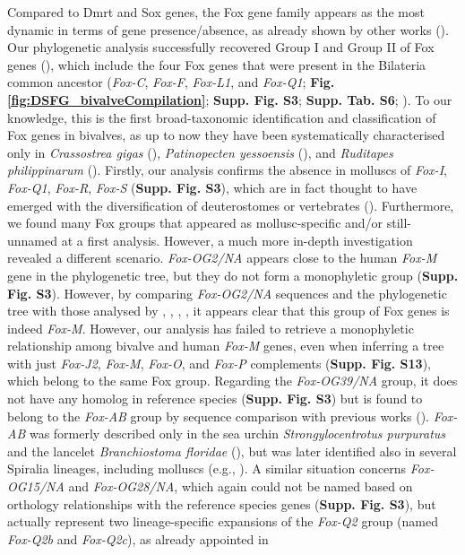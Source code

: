 \documentclass[../main.tex]{subfiles}
\begin{document}
Compared to Dmrt and Sox genes, the Fox gene family appears as the most dynamic in terms of gene presence/absence, as already shown by other works (\textbf{\cite{wu2020identification,schomburg2022phylogenetic,seudre2022fox}}). Our phylogenetic analysis successfully recovered Group I and Group II of Fox genes (\textbf{\cite{larroux2008genesis}}), which include the four Fox genes that were present in the Bilateria common ancestor (\textit{Fox-C}, \textit{Fox-F}, \textit{Fox-L1}, and \textit{Fox-Q1}; \textbf{Fig. \ref{fig:DSFG_bivalveCompilation}}; \textbf{Supp. Fig. S3}; \textbf{Supp. Tab. S6}; \textbf{\cite{shimeld2010clustered}}). To our knowledge, this is the first broad-taxonomic identification and classification of Fox genes in bivalves, as up to now they have been systematically characterised only in \textit{Crassostrea gigas} (\textbf{\cite{yang2014phylogeny}}), \textit{Patinopecten yessoensis} (\textbf{\cite{wu2020identification}}), and \textit{Ruditapes philippinarum} (\textbf{\cite{liu2024characterization}}). Firstly, our analysis confirms the absence in molluscs of \textit{Fox-I}, \textit{Fox-Q1}, \textit{Fox-R}, \textit{Fox-S} (\textbf{Supp. Fig. S3}), which are in fact thought to have emerged with the diversification of deuterostomes or vertebrates (\textbf{\cite{yang2014phylogeny,wu2020identification,schomburg2022phylogenetic,seudre2022fox}}). Furthermore, we found many Fox groups that appeared as mollusc-specific and/or still-unnamed at a first analysis. However, a much more in-depth investigation revealed a different scenario. \textit{Fox-OG2/NA} appears close to the human \textit{Fox-M} gene in the phylogenetic tree, but they do not form a monophyletic group (\textbf{Supp. Fig. S3}). However, by comparing \textit{Fox-OG2/NA} sequences and the phylogenetic tree with those analysed by \textbf{\cite{yang2014phylogeny}}, \textbf{\cite{wu2020identification}}, \textbf{\cite{schomburg2022phylogenetic}}, \textbf{\cite{seudre2022fox}}, it appears clear that this group of Fox genes is indeed \textit{Fox-M}. However, our analysis has failed to retrieve a monophyletic relationship among bivalve and human \textit{Fox-M} genes, even when inferring a tree with just \textit{Fox-J2}, \textit{Fox-M}, \textit{Fox-O}, and \textit{Fox-P} complements (\textbf{Supp. Fig. S13}), which belong to the same Fox group. Regarding the \textit{Fox-OG39/NA} group, it does not have any homolog in reference species (\textbf{Supp. Fig. S3}) but is found to belong to the \textit{Fox-AB} group by sequence comparison with previous works (\textbf{\cite{yang2014phylogeny,wu2020identification,seudre2022fox}}). \textit{Fox-AB} was formerly described only in the sea urchin \textit{Strongylocentrotus purpuratus} and the lancelet \textit{Branchiostoma floridae} (\textbf{\cite{yu2008fox,tu2006sea}}), but was later identified also in several Spiralia lineages, including molluscs (e.g., \textbf{\cite{yang2014phylogeny,wu2020identification,seudre2022fox}}). A similar situation concerns \textit{Fox-OG15/NA} and \textit{Fox-OG28/NA}, which again could not be named based on orthology relationships with the reference species genes (\textbf{Supp. Fig. S3}), but actually represent two lineage-specific expansions of the \textit{Fox-Q2} group (named \textit{Fox-Q2b} and \textit{Fox-Q2c}), as already appointed in 
\end{document}
